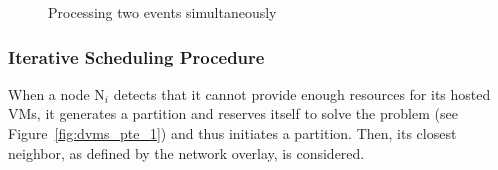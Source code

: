 \begin{figure}[tb]
%
%
%
%
\caption{Processing two events simultaneously\label{fig:dvms_pte}}
\vspace*{-.6cm}
\end{figure}


\subsubsection{Iterative Scheduling Procedure}
\label{sec:ISP}

When a node N\(_{\textit{i}}\)
detects that it cannot provide enough resources for its hosted VMs, it
generates a partition and reserves itself to solve the problem (see
Figure~\ref{fig:dvms_pte_1}) and thus initiates a partition. Then, its
closest neighbor, as defined by the network overlay, is considered.

